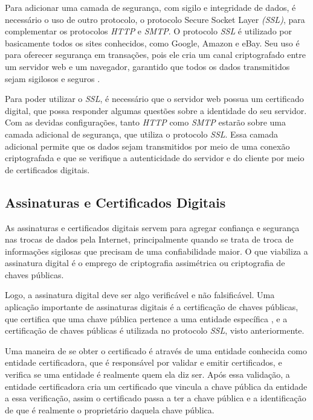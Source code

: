 Para adicionar uma camada de segurança, com sigilo e integridade de dados, é necessário
o uso de outro protocolo, o protocolo Secure Socket Layer \textit{(SSL)}, para 
complementar os protocolos \textit{HTTP} e \textit{SMTP}. O protocolo \textit{SSL} 
é utilizado por basicamente todos os sites conhecidos, como Google,
Amazon e eBay. Seu uso é para oferecer segurança em transações, pois ele cria um
canal criptografado entre um servidor web e um navegador, garantido que todos os
dados transmitidos sejam sigilosos e seguros \cite{kurose2010redes}. 

Para poder utilizar o \textit{SSL}, é necessário que o servidor web 
possua um certificado digital, que possa responder algumas questões sobre a 
identidade do seu servidor. Com as devidas configurações, tanto \textit{HTTP} como 
\textit{SMTP} estarão sobre uma camada adicional de segurança, que utiliza o 
protocolo \textit{SSL}. Essa camada adicional permite que os dados sejam 
transmitidos por meio de uma conexão criptografada e que se verifique a autenticidade
do servidor e do cliente por meio de certificados digitais. 

\subsection{Assinaturas e Certificados Digitais}

As assinaturas e certificados digitais servem para agregar confiança e segurança
nas trocas de dados pela Internet, principalmente quando se trata de troca de informações
sigilosas que precisam de uma confiabilidade maior. O que viabiliza a assinatura 
digital é o emprego de criptografia assimétrica ou criptografia de chaves públicas. 

Logo, a assinatura digital deve ser algo verificável e não falsificável. Uma
aplicação importante de assinaturas digitais é a certificação de chaves públicas,
que certifica que uma chave pública pertence a uma entidade específica \cite{kurose2010redes},
e a certificação de chaves públicas é utilizada no protocolo \textit{SSL}, visto anteriormente.

Uma maneira de se obter o certificado é através de uma entidade conhecida como
entidade certificadora, que é responsável por validar e emitir certificados, e
verifica se uma entidade é realmente quem ela diz ser. Após essa validação, a
entidade certificadora cria um certificado que vincula a chave pública da entidade
a essa verificação, assim o certificado passa a ter a chave pública e a
identificação de que é realmente o proprietário daquela chave pública.

